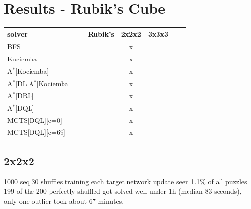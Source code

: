 
\chapter{Results - Rubik's Cube} %

\label{sec:ResRubiks} %






\begin{center}
\begin{tabular}{l*{5}{c}r}
\hline
\textbf{solver}      & & \textbf{Rubik's} & \textbf{2x2x2} & \textbf{3x3x3} \\
\hline
BFS   &   &        & x   &   \\
\hline
Kociemba   &   &      & x  &   \\
\hline
A$^{*}$[Kociemba]  &   &  & x & \\
\hline
A$^{*}$[DL[A$^{*}$[Kociemba]]]  &   &  & x & \\
\hline
A$^{*}$[DRL]  &   &  & x &  \\
\hline
A$^{*}$[DQL]  &   &  & x &  \\
\hline
MCTS[DQL][c=0]  &   &  & x &  \\
\hline
MCTS[DQL][c=69]  &   & & x &  \\
\hline
\end{tabular}
\end{center}








\section{2x2x2}

1000 seq 30 shuffles training each target network update seen 1.1\% of all puzzles
199 of the 200 perfectly shuffled got solved well under 1h (median 83 seconds), only one outlier took about 67 minutes.


